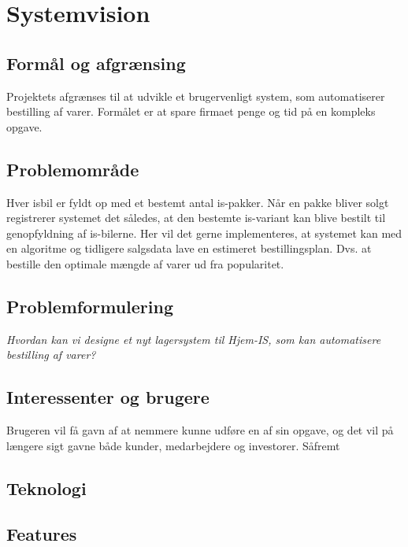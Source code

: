 \chapter{Systemvision}\label{ch:systemvision}

\section{Formål og afgrænsing}
Projektets afgrænses til at udvikle et brugervenligt system, som automatiserer bestilling af varer. 
Formålet er at spare firmaet penge og tid på en kompleks opgave.

\section{Problemområde}
Hver isbil er fyldt op med et bestemt antal is-pakker. Når en pakke bliver solgt registrerer systemet det således, at den bestemte is-variant kan blive bestilt til genopfyldning af is-bilerne. Her vil det gerne implementeres, at systemet kan med en algoritme og tidligere salgsdata lave en estimeret bestillingsplan. Dvs. at bestille den optimale mængde af varer ud fra popularitet. 


\section{Problemformulering}
 \textit{Hvordan kan vi designe et nyt lagersystem til Hjem-IS, som kan automatisere bestilling af varer?}

 \section{Interessenter og brugere}
 Brugeren vil få gavn af at nemmere kunne udføre en af sin opgave, og det vil på længere sigt gavne både kunder, medarbejdere og investorer. Såfremt 

 \section{Teknologi}

 \section{Features}
